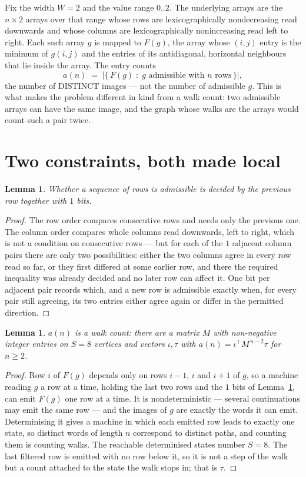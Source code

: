 \documentclass[11pt,a4paper]{article}
\theoremstyle{plain}
\newtheorem{lemma}[theorem]{Lemma}
\theoremstyle{definition}
\begin{document}
Fix the width $W=2$ and the value range $0..2$. The underlying arrays are the
$n\times2$ arrays over that range whose rows are lexicographically nondecreasing read downwards
and whose columns are lexicographically nonincreasing read left to right. Each such array $g$
is mapped to $F(g)$, the array whose $(i,j)$ entry is the minimum of $g(i,j)$ and the entries
of its antidiagonal, horizontal neighbours that lie inside the array. The entry counts
\[
a(n)\;=\;\bigl|\{\,F(g)\;:\;g\text{ admissible with }n\text{ rows}\,\}\bigr|,
\]
the number of DISTINCT images --- not the number of admissible $g$. This is what makes the
problem different in kind from a walk count: two admissible arrays can have the same image, and
the graph whose walks are the arrays would count such a pair twice.

\section{Two constraints, both made local}

\begin{lemma}\label{lem:local}
Whether a sequence of rows is admissible is decided by the previous row together with
$1$ bits.
\end{lemma}

\begin{proof}
The row order compares consecutive rows and needs only the previous one. The column order
compares whole columns read downwards, left to right, which is not a condition on consecutive
rows --- but for each of the $1$ adjacent column pairs there are only two possibilities:
either the two columns agree in every row read so far, or they first differed at some earlier
row, and there the required inequality was already decided and no later row can affect it. One
bit per adjacent pair records which, and a new row is admissible exactly when, for every pair
still agreeing, its two entries either agree again or differ in the permitted direction.
\end{proof}

\begin{lemma}\label{lem:det}
$a(n)$ is a walk count: there are a matrix $M$ with non-negative integer entries on $S=8$
vertices and vectors $\iota,\tau$ with $a(n)=\iota^{\!\top}M^{\,n-2}\tau$ for $n\ge2$.
\end{lemma}

\begin{proof}
Row $i$ of $F(g)$ depends only on rows $i-1$, $i$ and $i+1$ of $g$, so a machine reading $g$ a
row at a time, holding the last two rows and the $1$ bits of Lemma~\ref{lem:local}, can
emit $F(g)$ one row at a time. It is nondeterministic --- several continuations may emit the
same row --- and the images of $g$ are exactly the words it can emit. Determinising it gives a
machine in which each emitted row leads to exactly one state, so distinct words of length $n$
correspond to distinct paths, and counting them is counting walks. The reachable determinised
states number $S=8$. The last filtered row is emitted with no row below it, so it is not a
step of the walk but a count attached to the state the walk stops in; that is $\tau$.
\end{proof}
\end{document}
